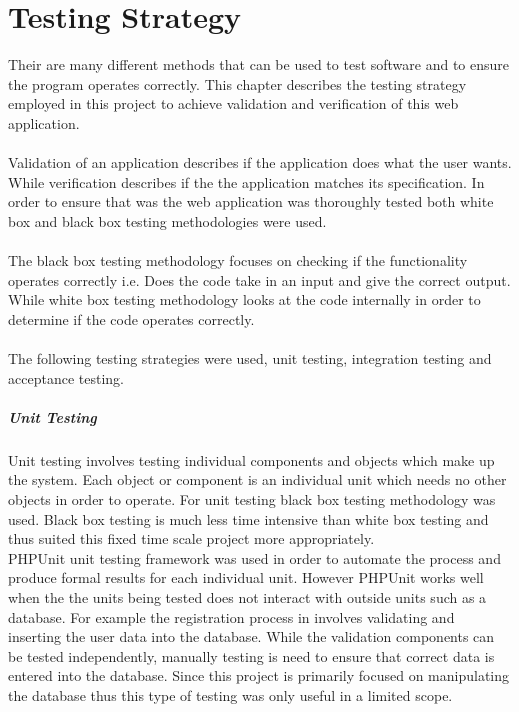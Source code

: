 \documentclass[a4paper,oneside,11pt]{report}
\begin{document}
\section{Testing Strategy}
Their are many different methods that can be used to test software and to ensure the program operates correctly. This chapter describes the testing strategy employed in this project to achieve validation and verification of this web application.
\\
\\
Validation of an application describes if the application does what the user wants. While verification describes if the the application matches its specification. In order to ensure that was the web application was thoroughly tested both white box and black box testing methodologies were used.
\\
\\
The black box testing methodology focuses on checking if the functionality operates correctly i.e. Does the code take in an input and give the correct output. While white box testing methodology looks at the code internally in order to determine if the code operates correctly.
\\
\\
The following testing strategies were used, unit testing, integration testing and acceptance testing.
\subparagraph{Unit Testing}
Unit testing involves testing individual components and objects which make up the system. Each object or component is an individual unit which needs no other objects in order to operate. For unit testing black box testing methodology was used. Black box testing is much less time intensive than white box testing and thus suited this fixed time scale project more appropriately.
\\
PHPUnit unit testing framework was used in order to automate the process and produce formal results for each individual unit. However PHPUnit works well when the the units being tested does not interact with outside units such as a database. For example the registration process in involves validating and inserting the user data into the database. While the validation components can be tested independently, manually testing is need to ensure that correct data is entered into the database. Since this project is primarily focused on manipulating the database thus this type of testing was only useful in a limited scope.
\end{document}
